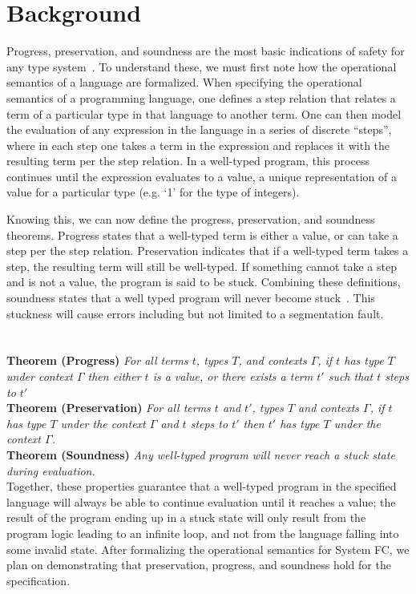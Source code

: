 \documentclass{sig-alternate}
\begin{document}
\section{Background}
\label{sec:background}
Progress, preservation, and soundness are the most basic indications of safety for any type system~\cite{Pierce:TAPL}. To understand these, we must first note how the operational semantics of a language are formalized. When specifying the operational semantics of a programming language, one defines a step relation that relates a term of a particular type in that language to another term. One can then model the evaluation of any expression in the language in a series of discrete ``steps'', where in each step one takes a term in the expression and replaces it with the resulting term per the step relation. In a well-typed program, this process continues until the expression evaluates to a value, a unique representation of a value for a particular type (e.g. `1' for the type of integers). 

Knowing this, we can now define the progress, preservation, and soundness theorems. Progress states that a well-typed term is either a value, or can take a step per the step relation. Preservation indicates that if a well-typed term takes a step, the resulting term will still be well-typed. If something cannot take a step and is not a value, the program is said to be stuck. Combining these definitions, soundness states that a well typed program will never become stuck~\cite{Pierce:TAPL}. This stuckness will cause errors including but not limited to a segmentation fault. \\\\\\
\noindent\textbf{Theorem (Progress)} \textit{For all terms $t$, types $T$, and contexts $\Gamma$, if $t$ has type $T$ under context $\Gamma$ then either $t$ is a value, or there exists a term $t'$ such that $t$ steps to $t'$} \\

\noindent\textbf{Theorem (Preservation)} \textit{For all terms $t$ and $t'$, types $T$ and contexts $\Gamma$, if $t$ has type $T$ under the context $\Gamma$ and $t$ steps to $t'$ then $t'$ has type $T$ under the context $\Gamma$.} \\

\noindent\textbf{Theorem (Soundness)} \textit{Any well-typed program will never reach a stuck state during evaluation.}\\

Together, these properties guarantee that a well-typed program in the specified language will always be able to continue evaluation until it reaches a value; the result of the program ending up in a stuck state will only result from the program logic leading to an infinite loop, and not from the language falling into some invalid state. After formalizing the operational semantics for System FC, we plan on demonstrating that preservation, progress, and soundness hold for the specification.
\end{document}
